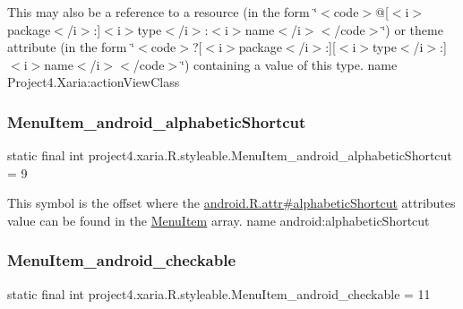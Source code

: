 This may also be a reference to a resource (in the form \char`\"{}$<$code$>$@\mbox{[}$<$i$>$package$<$/i$>$\+:\mbox{]}$<$i$>$type$<$/i$>$\+:$<$i$>$name$<$/i$>$$<$/code$>$\char`\"{}) or theme attribute (in the form \char`\"{}$<$code$>$?\mbox{[}$<$i$>$package$<$/i$>$\+:\mbox{]}\mbox{[}$<$i$>$type$<$/i$>$\+:\mbox{]}$<$i$>$name$<$/i$>$$<$/code$>$\char`\"{}) containing a value of this type.  name Project4.\+Xaria\+:action\+View\+Class \mbox{\label{classproject4_1_1xaria_1_1R_1_1styleable_aeb141859a1dafcfccfcc8935ac95cc18}} 
\subsubsection{\texorpdfstring{Menu\+Item\+\_\+android\+\_\+alphabetic\+Shortcut}{MenuItem\_android\_alphabeticShortcut}}
{\footnotesize\ttfamily static final int project4.\+xaria.\+R.\+styleable.\+Menu\+Item\+\_\+android\+\_\+alphabetic\+Shortcut = 9\hspace{0.3cm}{\ttfamily [static]}}

This symbol is the offset where the \hyperlink{}{android.\+R.\+attr\#alphabetic\+Shortcut} attribute\textquotesingle{}s value can be found in the \hyperlink{classproject4_1_1xaria_1_1R_1_1styleable_a8a573827fcaba6497e560662224b5530}{Menu\+Item} array.  name android\+:alphabetic\+Shortcut \mbox{\label{classproject4_1_1xaria_1_1R_1_1styleable_a6db17e4fd6d4d5c9afd707369ba1b57e}} 
\subsubsection{\texorpdfstring{Menu\+Item\+\_\+android\+\_\+checkable}{MenuItem\_android\_checkable}}
{\footnotesize\ttfamily static final int project4.\+xaria.\+R.\+styleable.\+Menu\+Item\+\_\+android\+\_\+checkable = 11\hspace{0.3cm}{\ttfamily [static]}}

